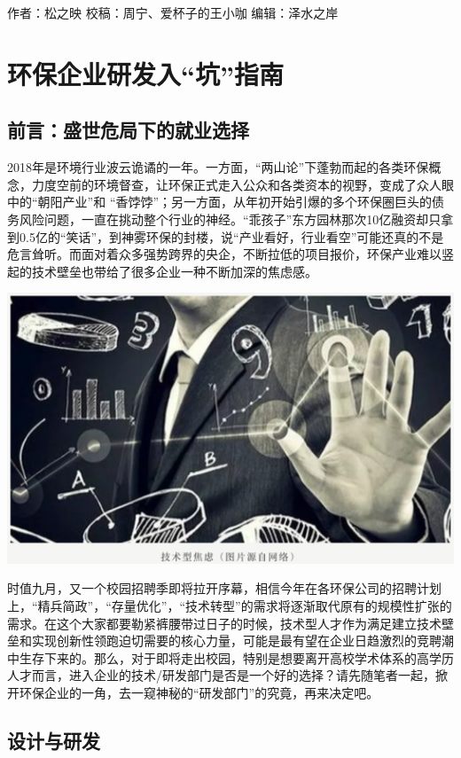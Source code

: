 \documentclass[]{book}
\begin{document}
作者：松之映 校稿：周宁、爱杯子的王小咖 编辑：泽水之岸

\section{\texorpdfstring{环保企业研发入``坑''指南}{环保企业研发入坑指南}}

\subsection{前言：盛世危局下的就业选择}

2018年是环境行业波云诡谲的一年。一方面，``两山论''下蓬勃而起的各类环保概念，力度空前的环境督查，让环保正式走入公众和各类资本的视野，变成了众人眼中的``朝阳产业''和
``香饽饽''；另一方面，从年初开始引爆的多个环保圈巨头的债务风险问题，一直在挑动整个行业的神经。``乖孩子''东方园林那次10亿融资却只拿到0.5亿的``笑话''，到神雾环保的封楼，说``产业看好，行业看空''可能还真的不是危言耸听。而面对着众多强势跨界的央企，不断拉低的项目报价，环保产业难以竖起的技术壁垒也带给了很多企业一种不断加深的焦虑感。

\includegraphics[width=6.67in]{images/qiye1}

时值九月，又一个校园招聘季即将拉开序幕，相信今年在各环保公司的招聘计划上，``精兵简政''，``存量优化''，``技术转型''的需求将逐渐取代原有的规模性扩张的需求。在这个大家都要勒紧裤腰带过日子的时候，技术型人才作为满足建立技术壁垒和实现创新性领跑迫切需要的核心力量，可能是最有望在企业日趋激烈的竞聘潮中生存下来的。那么，对于即将走出校园，特别是想要离开高校学术体系的高学历人才而言，进入企业的技术/研发部门是否是一个好的选择？请先随笔者一起，掀开环保企业的一角，去一窥神秘的``研发部门''的究竟，再来决定吧。

\subsection{设计与研发}
\end{document}

